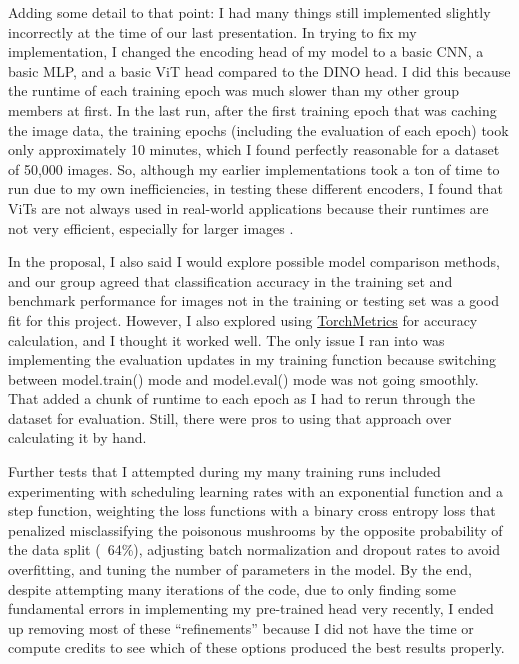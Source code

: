 \documentclass[journal]{IEEEtran}
\begin{document}
Adding some detail to that point: I had many things still implemented slightly incorrectly at the time of our last presentation. In trying to fix my implementation, I changed the encoding head of my model to a basic CNN, a basic MLP, and a basic ViT head compared to the DINO head. I did this because the runtime of each training epoch was much slower than my other group members at first. In the last run, after the first training epoch that was caching the image data, the training epochs (including the evaluation of each epoch) took only approximately 10 minutes, which I found perfectly reasonable for a dataset of 50,000 images. So, although my earlier implementations took a ton of time to run due to my own inefficiencies, in testing these different encoders, I found that ViTs are not always used in real-world applications because their runtimes are not very efficient, especially for larger images \cite{ViTSpeeds}. 

In the proposal, I also said I would explore possible model comparison methods, and our group agreed that classification accuracy in the training set and benchmark performance for images not in the training or testing set was a good fit for this project. However, I also explored using \href{https://lightning.ai/docs/torchmetrics/stable/}{TorchMetrics} for accuracy calculation, and I thought it worked well. The only issue I ran into was implementing the evaluation updates in my training function because switching between model.train() mode and model.eval() mode was not going smoothly. That added a chunk of runtime to each epoch as I had to rerun through the dataset for evaluation. Still, there were pros to using that approach over calculating it by hand.  

Further tests that I attempted during my many training runs included experimenting with scheduling learning rates with an exponential function and a step function, weighting the loss functions with a binary cross entropy loss that penalized misclassifying the poisonous mushrooms by the opposite probability of the data split (~64\%), adjusting batch normalization and dropout rates to avoid overfitting, and tuning the number of parameters in the model. By the end, despite attempting many iterations of the code, due to only finding some fundamental errors in implementing my pre-trained head very recently, I ended up removing most of these “refinements” because I did not have the time or compute credits to see which of these options produced the best results properly.
\end{document}
